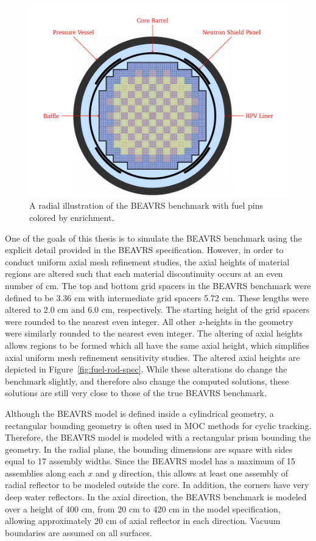 \begin{figure}[h!]
	\centering
	\includegraphics[width=\linewidth]{figures/beavrs-visual/beavrs-assembly-enrichment.png}
	\caption{A radial illustration of the BEAVRS benchmark with fuel pins colored by enrichment.}
	\label{fig:beavrs-assembly-enrichment}
\end{figure} 

One of the goals of this thesis is to simulate the BEAVRS benchmark using the explicit detail provided in the BEAVRS specification. However, in order to conduct uniform axial mesh refinement studies, the axial heights of material regions are altered such that each material discontinuity occurs at an even number of cm. The top and bottom grid spacers in the BEAVRS benchmark were defined to be 3.36 cm with intermediate grid spacers 5.72 cm. These lengths were altered to 2.0 cm and 6.0 cm, respectively. The starting height of the grid spacers were rounded to the nearest even integer. All other $z$-heights in the geometry were similarly rounded to the nearest even integer. The altering of axial heights allows regions to be formed which all have the same axial height, which simplifies axial uniform mesh refinement sensitivity studies. The altered axial heights are depicted in Figure~\ref{fig:fuel-rod-spec}. While these alterations do change the benchmark slightly, and therefore also change the computed solutions, these solutions are still very close to those of the true BEAVRS benchmark.



Although the BEAVRS model is defined inside a cylindrical geometry, a rectangular bounding geometry is often used in \ac{MOC} methods for cyclic tracking. Therefore, the BEAVRS model is modeled with a rectangular prism bounding the geometry. In the radial plane, the bounding dimensions are square with sides equal to 17 assembly widths. Since the BEAVRS model has a maximum of 15 assemblies along each $x$ and $y$ direction, this allows at least one assembly of radial reflector to be modeled outside the core. In addition, the corners have very deep water reflectors. In the axial direction, the BEAVRS benchmark is modeled over a height of 400 cm, from 20 cm to 420 cm in the model specification, allowing approximately 20 cm of axial reflector in each direction. Vacuum boundaries are assumed on all surfaces. 


